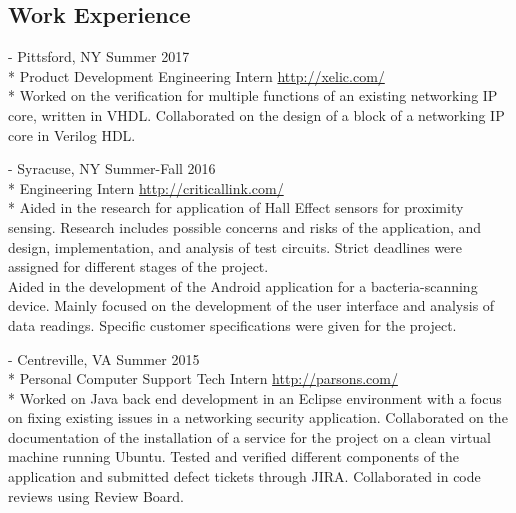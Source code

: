 \documentclass[a4paper,margin,line]{resume}
\newcommand{\rurl}[1]{\hfill {\footnotesize \url{#1}}}
\newcommand{\rdate}[1]{\hfill {\small #1}}
\renewcommand{\employer}[5]{ \item[#1] - #2 \rdate{#3} \\* #4 \rurl{#5} \\*}
\begin{document}
\begin{resume}
\section{\mysidestyle Work Experience}
    \begin{asparadesc}
        \employer{Xelic}{Pittsford, NY}{Summer 2017}{Product Development Engineering Intern}
        {http://xelic.com/}
        \small Worked on the verification for multiple functions of an existing networking IP core, written in VHDL.  Collaborated on the design of a block of a networking IP core in Verilog HDL.
        \\
        \employer{Critical Link LLC}{Syracuse, NY}{Summer-Fall 2016}{Engineering Intern}
        {http://criticallink.com/}
        \small
        Aided in the research for application of Hall Effect sensors for proximity sensing.  
        Research includes possible concerns and risks of the application, and design, implementation, and analysis of 
        test circuits.  Strict deadlines were assigned for different stages of the project.\smallskip\\
        Aided in the development of the Android application for a bacteria-scanning device.  Mainly focused on the development of the user 
        interface and analysis of data readings.  Specific customer specifications were given for the project. 
        \\
        \employer{Parsons Government Services}{Centreville, VA}{Summer 2015}{Personal Computer Support Tech Intern}
        {http://parsons.com/}
        \small
        Worked on Java back end development in an Eclipse environment with a focus on fixing existing 
        issues in a networking security application. Collaborated on the documentation of the installation 
        of a service for the project on a clean virtual machine running Ubuntu. Tested and verified 
        different components of the application and submitted defect tickets through JIRA.  Collaborated 
        in code reviews using Review Board.
        \normalsize
        \\
        
    \end{asparadesc}


\end{resume}
\end{document}
